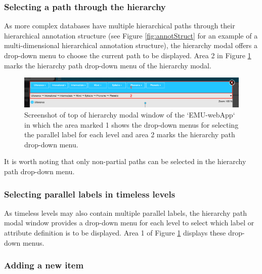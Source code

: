 \documentclass[]{book}
\theoremstyle{definition}
\theoremstyle{definition}
\theoremstyle{definition}
\theoremstyle{remark}
\begin{document}
\hypertarget{selecting-a-path-through-the-hierarchy}{%
\subsubsection{Selecting a path through the
hierarchy}\label{selecting-a-path-through-the-hierarchy}}

As more complex databases have multiple hierarchical paths through their
hierarchical annotation structure (see Figure \ref{fig:annotStruct} for
an example of a multi-dimensional hierarchical annotation structure),
the hierarchy modal offers a drop-down menu to choose the current path
to be displayed. Area 2 in Figure \ref{fig:webApp-hierModalTop} marks
the hierarchy path drop-down menu of the hierarchy modal.

\begin{figure}

{\centering \includegraphics[width=0.85\linewidth]{pics/emu-webAppHierModalTop} 

}

\caption{Screenshot of top of hierarchy modal window of the `EMU-webApp` in which the area marked 1 shows the drop-down menus for selecting the parallel label for each level and area 2 marks the hierarchy path drop-down menu.}\label{fig:webApp-hierModalTop}
\end{figure}

It is worth noting that only non-partial paths can be selected in the
hierarchy path drop-down menu.

\hypertarget{selecting-parallel-labels-in-timeless-levels}{%
\subsubsection{Selecting parallel labels in timeless
levels}\label{selecting-parallel-labels-in-timeless-levels}}

As timeless levels may also contain multiple parallel labels, the
hierarchy path modal window provides a drop-down menu for each level to
select which label or attribute definition is to be displayed. Area 1 of
Figure \ref{fig:webApp-hierModalTop} displays these drop-down menus.

\hypertarget{adding-a-new-item}{%
\subsubsection{Adding a new item}\label{adding-a-new-item}}
\end{document}
